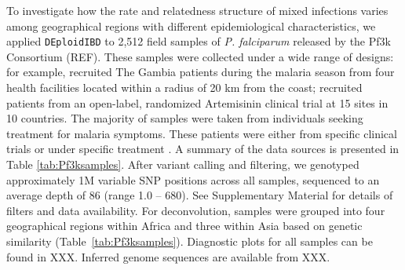 \documentclass[9pt,lineno]{elife}
\begin{document}
To investigate how the rate and relatedness structure of mixed infections varies among geographical regions with different epidemiological characteristics, we applied \texttt{DEploidIBD} to 2,512 field samples of {\it P. falciparum} released by the Pf3k Consortium (REF).  These samples were collected under a wide range of designs: for example, \citet{Amambua-Ngwa2012} recruited The Gambia patients during the malaria season from four health facilities located within a radius of 20 km from the coast; \citet{Ashley2014} recruited patients from an open-label, randomized Artemisinin clinical trial at 15 sites in 10 countries. The majority of samples were taken from individuals seeking treatment for malaria symptoms. These patients were either from specific clinical trials \citep{Ocholla2014} or under specific treatment \citep{Duffy2015, Miotto2013,eLife2016}.  A summary of the data sources is presented in Table \ref{tab:Pf3ksamples}.  After variant calling and filtering, we genotyped approximately 1M variable SNP positions across all samples, sequenced to an average depth of 86 (range 1.0 – 680).  See Supplementary Material for details of filters and data availability.  For deconvolution, samples were grouped into four geographical regions within Africa and three within Asia based on genetic similarity (Table~\ref{tab:Pf3ksamples}).  Diagnostic plots for all samples can be found in XXX.  Inferred genome sequences are available from XXX.
\end{document}
